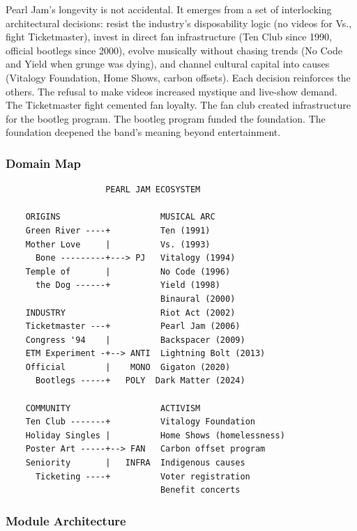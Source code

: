 \documentclass[11pt,letterpaper]{article}
\begin{document}
Pearl Jam's longevity is not accidental. It emerges from a set of interlocking architectural decisions: resist the industry's disposability logic (no videos for Vs., fight Ticketmaster), invest in direct fan infrastructure (Ten Club since 1990, official bootlegs since 2000), evolve musically without chasing trends (No Code and Yield when grunge was dying), and channel cultural capital into causes (Vitalogy Foundation, Home Shows, carbon offsets). Each decision reinforces the others. The refusal to make videos increased mystique and live-show demand. The Ticketmaster fight cemented fan loyalty. The fan club created infrastructure for the bootleg program. The bootleg program funded the foundation. The foundation deepened the band's meaning beyond entertainment.

\subsubsection{Domain Map}

\begin{asciibox}
\begin{verbatim}
                    PEARL JAM ECOSYSTEM
                    
    ORIGINS                    MUSICAL ARC
    Green River ----+          Ten (1991)
    Mother Love     |          Vs. (1993)
      Bone ---------+---> PJ   Vitalogy (1994)
    Temple of       |          No Code (1996)
      the Dog ------+          Yield (1998)
                               Binaural (2000)
    INDUSTRY                   Riot Act (2002)
    Ticketmaster ---+          Pearl Jam (2006)
    Congress '94    |          Backspacer (2009)
    ETM Experiment -+--> ANTI  Lightning Bolt (2013)
    Official        |    MONO  Gigaton (2020)
      Bootlegs -----+   POLY  Dark Matter (2024)
                               
    COMMUNITY                  ACTIVISM
    Ten Club -------+          Vitalogy Foundation
    Holiday Singles |          Home Shows (homelessness)
    Poster Art -----+--> FAN   Carbon offset program
    Seniority       |   INFRA  Indigenous causes
      Ticketing ----+          Voter registration
                               Benefit concerts
\end{verbatim}
\end{asciibox}

\subsubsection{Module Architecture}
\end{document}
